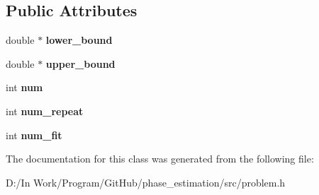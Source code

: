 \subsection*{Public Attributes}
\begin{DoxyCompactItemize}
\item 
\hypertarget{classProblem_a4dfde0675e59264970f418516b799b2c}{}double $\ast$ {\bfseries lower\+\_\+bound}\label{classProblem_a4dfde0675e59264970f418516b799b2c}

\item 
\hypertarget{classProblem_a02bd6d1e098e211cc3bf0f5e02f20133}{}double $\ast$ {\bfseries upper\+\_\+bound}\label{classProblem_a02bd6d1e098e211cc3bf0f5e02f20133}

\item 
\hypertarget{classProblem_ae46e65561288cc81f06c2ddae062d303}{}int {\bfseries num}\label{classProblem_ae46e65561288cc81f06c2ddae062d303}

\item 
\hypertarget{classProblem_a02dc7cd36750260516f536d4b519399d}{}int {\bfseries num\+\_\+repeat}\label{classProblem_a02dc7cd36750260516f536d4b519399d}

\item 
\hypertarget{classProblem_a11dbb1d5a91b82ac8bab777362003e43}{}int {\bfseries num\+\_\+fit}\label{classProblem_a11dbb1d5a91b82ac8bab777362003e43}

\end{DoxyCompactItemize}


The documentation for this class was generated from the following file\+:\begin{DoxyCompactItemize}
\item 
D\+:/\+In Work/\+Program/\+Git\+Hub/phase\+\_\+estimation/src/problem.\+h\end{DoxyCompactItemize}
